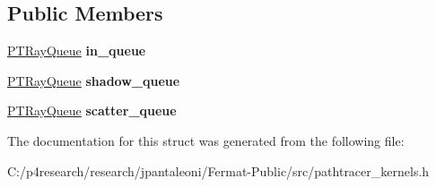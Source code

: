 \subsection*{Public Members}
\begin{DoxyCompactItemize}
\item 
\mbox{\label{struct_p_t_context_queues_abd67af1117a145256e9f1ddeab981c52}} 
\hyperlink{struct_p_t_ray_queue}{P\+T\+Ray\+Queue} {\bfseries in\+\_\+queue}
\item 
\mbox{\label{struct_p_t_context_queues_a261be8f0db1550539ad3afff81fe2ab0}} 
\hyperlink{struct_p_t_ray_queue}{P\+T\+Ray\+Queue} {\bfseries shadow\+\_\+queue}
\item 
\mbox{\label{struct_p_t_context_queues_abea56162a6ad0052adf0fc597b0f961b}} 
\hyperlink{struct_p_t_ray_queue}{P\+T\+Ray\+Queue} {\bfseries scatter\+\_\+queue}
\end{DoxyCompactItemize}


The documentation for this struct was generated from the following file\+:\begin{DoxyCompactItemize}
\item 
C\+:/p4research/research/jpantaleoni/\+Fermat-\/\+Public/src/pathtracer\+\_\+kernels.\+h\end{DoxyCompactItemize}
